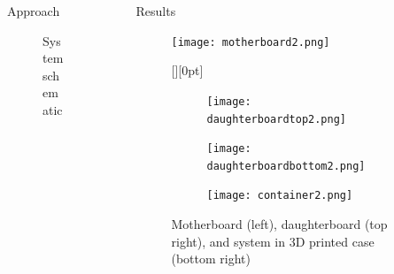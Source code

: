\documentclass[final]{beamer}
\newlength{\sepwidth}
\newlength{\colwidth}
\newcommand{\separatorcolumn}{\begin{column}{\sepwidth}
\end{column}}
\begin{document}
\begin{frame}[t]
\begin{columns}[t]
\begin{column}{\colwidth}
\begin{block}{Approach}
					\begin{figure}
						\caption{System schematic}
					\end{figure}
				\end{block}
			\end{column}

			\separatorcolumn

			\begin{column}{\colwidth}
				\begin{block}{Results}
					\begin{figure}
						\begin{minipage}[t]{0.47\textwidth}
							\texttt{[image: motherboard2.png]}
						\end{minipage}
						\hfill
						\begin{minipage}[t]{0.49\textwidth}
							\raisebox{185pt}[\height][0pt]{%
							\begin{minipage}{\textwidth}
								\begin{subfigure}
									{\textwidth}
									\texttt{[image: daughterboardtop2.png]}
								\end{subfigure}
								\vspace{0.01\textheight}
								\begin{subfigure}
									{\textwidth}
									\texttt{[image: daughterboardbottom2.png]}
								\end{subfigure}
								\vspace{0.01\textheight}
								\begin{subfigure}
									{\textwidth}
									\texttt{[image: container2.png]}
								\end{subfigure}
							\end{minipage}
							}
						\end{minipage}
						\centering
						\caption{Motherboard (left), daughterboard (top right), and system
						in 3D printed case (bottom right)}
					\end{figure}


\end{block}
\end{column}
\end{columns}
\end{frame}
\end{document}
